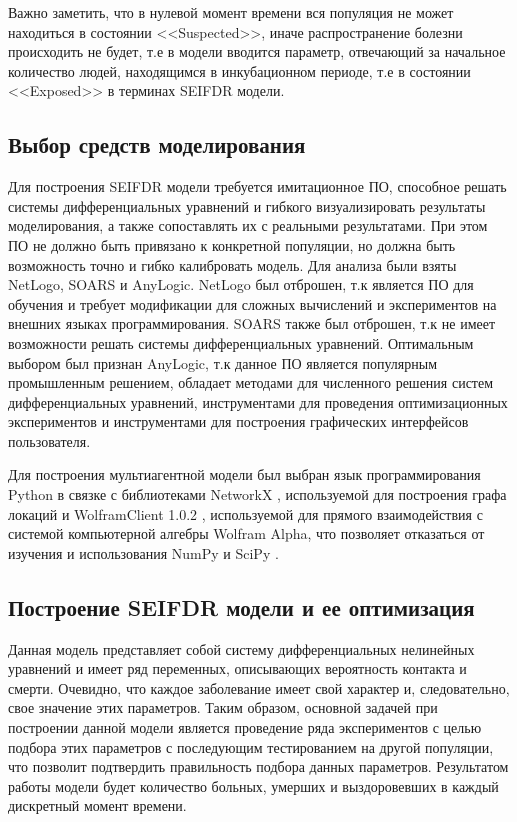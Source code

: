 Важно заметить, что в нулевой момент времени вся популяция не  может находиться в состоянии <<Suspected>>, иначе распространение болезни происходить не будет, т.е в модели вводится параметр, отвечающий за начальное количество людей, находящимся в инкубационном периоде, т.е в состоянии <<Exposed>>  в терминах SEIFDR модели.   
\subsection{Выбор средств моделирования}

Для построения SEIFDR модели требуется имитационное ПО, способное решать системы дифференциальных уравнений и гибкого визуализировать результаты моделирования, а также сопоставлять их с реальными результатами. При этом ПО не должно быть привязано к конкретной популяции, но должна быть возможность точно и гибко калибровать модель. Для анализа были взяты NetLogo, SOARS  и AnyLogic. NetLogo был отброшен, т.к является ПО для обучения и  требует модификации для сложных вычислений и экспериментов на внешних языках программирования. SOARS также был отброшен, т.к не имеет возможности решать системы дифференциальных уравнений. Оптимальным выбором был признан AnyLogic, т.к данное ПО является популярным промышленным решением, обладает методами для численного решения систем дифференциальных уравнений, инструментами для проведения оптимизационных экспериментов и инструментами для построения графических интерфейсов пользователя.


Для построения мультиагентной модели был выбран язык программирования Python в связке с библиотеками NetworkX %
\cite{NetworkX:git} , используемой для построения графа локаций 
и WolframClient 1.0.2 %
\cite{PiP:Wolfram}, используемой для прямого взаимодействия с системой компьютерной алгебры Wolfram Alpha, что позволяет отказаться от изучения и использования NumPy и SciPy %
.

\subsection{Построение SEIFDR модели и ее оптимизация}
Данная модель представляет собой систему дифференциальных нелинейных уравнений %
\cite{Wolfram_MW:SIR} и имеет ряд переменных, описывающих вероятность контакта и смерти. Очевидно, что каждое заболевание имеет свой характер и, следовательно, свое значение этих параметров. Таким образом, основной задачей при построении данной модели является проведение ряда экспериментов с целью подбора этих параметров с последующим тестированием на другой популяции, что позволит подтвердить правильность подбора данных параметров. Результатом работы модели будет  количество больных, умерших и выздоровевших в каждый дискретный момент времени.

